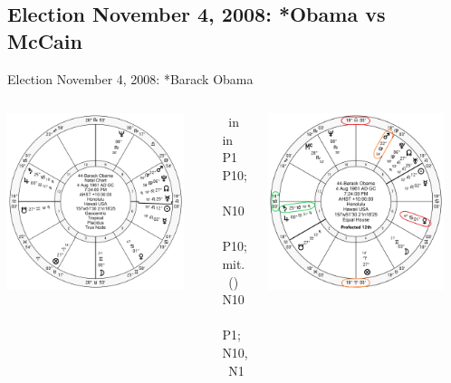 \subsection{Election November 4, 2008: *Obama vs McCain}
\begin{frame}[t]{Election November 4, 2008: *Barack Obama}
\small

\begin{columns}[T, onlytextwidth]
\vspace{-1em}
{\includegraphics[width=0.9\textwidth]{charts/Obama.png}}
\fontsize{7pt}{8pt}\selectfont

\Saturn\, in \Capricorn\, in P1 \Square\, P10; \Sextile\, N10 \\
\Venus\, \Trine\, P10; mit. \Quincunx\, (\Opposition) N10 \\
\Mars\, \Trine\, P1; \Square\, N10, \Opposition\, N1 

\vspace{-1em}
{\includegraphics[width=0.9\textwidth]{charts/Obama-Prof-12th.png}}
\fontsize{8pt}{9pt}\selectfont


\end{columns}
\end{frame}
